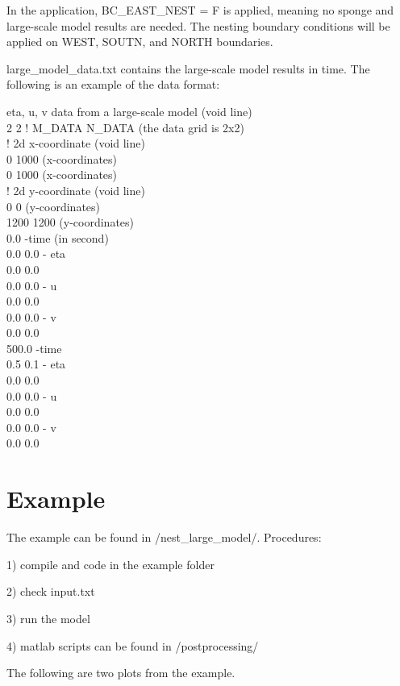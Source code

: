 \documentclass[preprint,10pt]{elsarticle}
\begin{document}
In the application,  BC\_EAST\_NEST = F is applied, meaning no sponge and large-scale model results are needed. The nesting boundary conditions will be applied on WEST, SOUTN, and NORTH boundaries. 

large\_model\_data.txt contains the large-scale model results in time. The following is an example of the data format:

\vspace{0.5cm}
\noindent
eta, u, v data from a large-scale model (void line) \\
2 2 ! M\_DATA N\_DATA (the data grid is 2x2) \\
! 2d x-coordinate (void line) \\
0 1000  (x-coordinates)\\
0 1000  (x-coordinates)\\
! 2d y-coordinate (void line)\\
0 0  (y-coordinates)\\
1200 1200 (y-coordinates) \\
0.0   -time (in second) \\
0.0 0.0 - eta \\
0.0 0.0 \\
0.0 0.0  - u \\
0.0 0.0 \\
0.0  0.0 - v \\
0.0 0.0  \\
500.0   -time \\
0.5 0.1 - eta \\
0.0 0.0 \\
0.0 0.0  - u \\
0.0 0.0 \\
0.0 0.0 - v \\
0.0 0.0  

   
\section{Example}

The example can be found in /nest\_large\_model/. Procedures:

1) compile and code in the example folder

2) check input.txt

3) run the model

4) matlab scripts can be found in /postprocessing/

The following are two plots from the example. 
\end{document}
